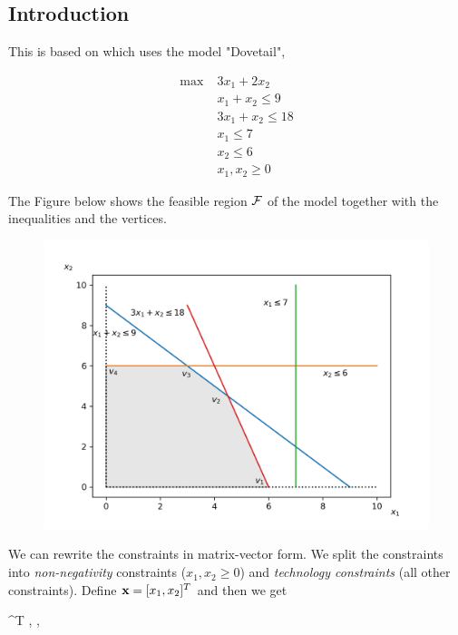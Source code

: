 
\subsection{Introduction}

This is based on \cite{Sierksma2015} which uses the model "Dovetail",

\begin{align*}
  \max \; & 3x_1 + 2x_2 \\
       & x_1 + x_2 \leq 9 \\
       & 3x_1 + x_2 \leq 18 \\
       & x_1 \leq 7 \\
       & x_2 \leq 6 \\
       & x_1, x_2 \geq 0
\end{align*}

The Figure below shows the feasible region $\mathcal{F}$ of the model together with the inequalities and the vertices.

\begin{figure}[H]
\includegraphics[scale = 0.7]{images/2022-09-27_lin_prog_1_01.png}
\end{figure}

We can rewrite the constraints in matrix-vector form. We split the constraints into \emph{non-negativity} constraints ($x_1, x_2 \geq 0$) and \emph{technology constraints} (all other constraints). Define $\mathbf{x} = [x_1, x_2]^T$ and then we get

\bee
\max \cbf^T \xbf, \quad {} \; \Abf \xbf \leq \bbf, \xbf \geq \zerobf
\eee

